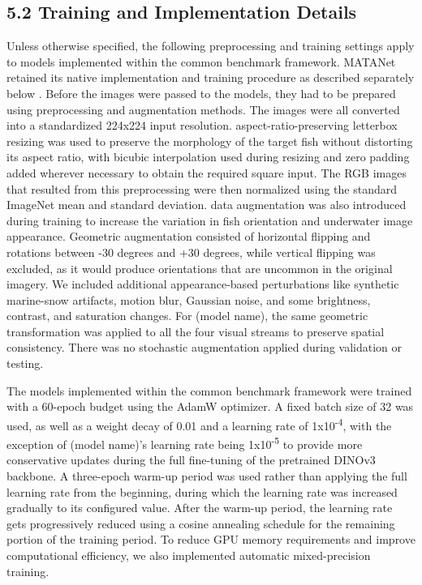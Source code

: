 \documentclass[preprint,12pt]{elsarticle}
\begin{document}
\subsection*{5.2 Training and Implementation
Details}\label{training-and-implementation-details}

Unless otherwise specified, the following preprocessing and training
settings apply to models implemented within the common benchmark
framework. MATANet retained its native implementation and training
procedure as described separately below
\cite{ref26}. Before the images were passed to
the models, they had to be prepared using preprocessing and augmentation
methods. The images were all converted into a standardized 224x224 input
resolution. aspect-ratio-preserving letterbox resizing was used to
preserve the morphology of the target fish without distorting its aspect
ratio, with bicubic interpolation used during resizing and zero padding
added wherever necessary to obtain the required square input. The RGB
images that resulted from this preprocessing were then normalized using
the standard ImageNet mean and standard deviation. data augmentation was
also introduced during training to increase the variation in fish
orientation and underwater image appearance. Geometric augmentation
consisted of horizontal flipping and rotations between -30 degrees and
+30 degrees, while vertical flipping was excluded, as it would produce
orientations that are uncommon in the original imagery. We included
additional appearance-based perturbations like synthetic marine-snow
artifacts, motion blur, Gaussian noise, and some brightness, contrast,
and saturation changes. For (model name), the same geometric
transformation was applied to all the four visual streams to preserve
spatial consistency. There was no stochastic augmentation applied during
validation or testing.

The models implemented within the common benchmark framework were
trained with a 60-epoch budget using the AdamW optimizer. A fixed batch
size of 32 was used, as well as a weight decay of 0.01 and a learning
rate of 1x10\textsuperscript{-4}, with the exception of (model name)'s
learning rate being 1x10\textsuperscript{-5} to provide more
conservative updates during the full fine-tuning of the pretrained
DINOv3 backbone. A three-epoch warm-up period was used rather than
applying the full learning rate from the beginning, during which the
learning rate was increased gradually to its configured value. After the
warm-up period, the learning rate gets progressively reduced using a
cosine annealing schedule for the remaining portion of the training
period. To reduce GPU memory requirements and improve computational
efficiency, we also implemented automatic mixed-precision training.
\end{document}
